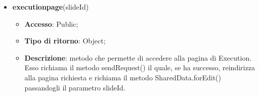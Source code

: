 {\begin{itemize}
\begin{itemize}
				\item \textbf{Descrizione}: metodo che permette di accedere alla pagina di Edit. Esso richiama il metodo sendRequest() il quale, se ha successo, reindirizza alla pagina richiesta e richiama il metodo SharedData.forEdit() passandogli il parametro slideId.
			\end{itemize}
			\item \textbf{executionpage}(slideId)
			\begin{itemize}
				\item \textbf{Accesso}: Public;
				\item \textbf{Tipo di ritorno}: Object;
				\item \textbf{Descrizione}: metodo che permette di accedere alla pagina di Execution. Esso richiama il metodo sendRequest() il quale, se ha successo, reindirizza alla pagina richiesta e richiama il metodo SharedData.forEdit() passandogli il parametro slideId.
			\end{itemize}
		\end{itemize} 
}

